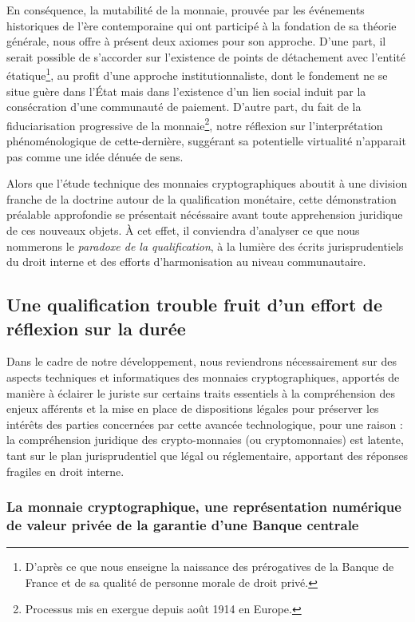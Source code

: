 { En conséquence, la mutabilité de la monnaie, prouvée par les événements historiques de l'ère contemporaine qui ont participé à la fondation de sa théorie générale, nous offre à présent deux axiomes pour son approche. D'une part, il serait possible de s'accorder sur l'existence de points de détachement avec l'entité étatique\footnote{D'après ce que nous enseigne la naissance des prérogatives de la Banque de France et de sa qualité de personne morale de droit privé.}, au profit d'une approche institutionnaliste, dont le fondement ne se situe guère dans l'État mais dans l'existence d'un lien social induit par la consécration d'une communauté de paiement. D'autre part, du fait de la fiduciarisation progressive de la monnaie\footnote{Processus mis en exergue depuis août 1914 en Europe.}, notre réflexion sur  l'interprétation phénoménologique de cette-dernière, suggérant sa potentielle virtualité n'apparait pas comme une idée dénuée de sens.\par 
 
 Alors que l'étude technique des monnaies cryptographiques aboutit à une division franche de la doctrine autour de la qualification monétaire, cette démonstration préalable approfondie se présentait nécéssaire avant toute apprehension juridique de ces nouveaux objets. À cet effet, il conviendra d'analyser ce que nous nommerons le \emph{paradoxe de la qualification}, à la lumière des écrits jurisprudentiels du droit interne et des efforts d'harmonisation au niveau communautaire.

\subsection{Une qualification trouble fruit d'un effort de réflexion sur la durée}

Dans le cadre de notre développement, nous reviendrons nécessairement sur des aspects techniques et informatiques des monnaies cryptographiques, apportés de manière à éclairer le juriste sur certains traits essentiels à la compréhension des enjeux afférents et la mise en place de dispositions légales pour préserver les intérêts des parties concernées par cette avancée technologique, pour une raison : la compréhension juridique des crypto-monnaies (ou cryptomonnaies) est latente, tant sur le plan jurisprudentiel que légal ou réglementaire, apportant des réponses fragiles en droit interne.\par

\subsubsection{La monnaie cryptographique, une \og représentation numérique de valeur privée de la garantie d'une Banque centrale\fg{}}

}
